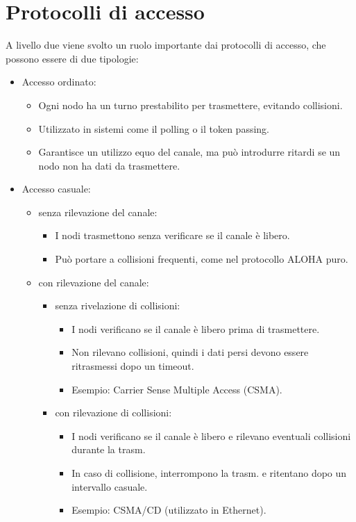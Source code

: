 \section{Protocolli di accesso}
A livello due viene svolto un ruolo importante dai protocolli di accesso, che possono essere di due tipologie:
\begin{itemize}
    \item Accesso ordinato:
    \begin{itemize}
        \item Ogni nodo ha un turno prestabilito per trasmettere, evitando collisioni.
        \item Utilizzato in sistemi come il polling o il token passing.
        \item Garantisce un utilizzo equo del canale, ma può introdurre ritardi se un nodo non ha dati da trasmettere.
    \end{itemize}
    \item Accesso casuale:
    \begin{itemize}
        \item senza rilevazione del canale:
        \begin{itemize}
            \item I nodi trasmettono senza verificare se il canale è libero.
            \item Può portare a collisioni frequenti, come nel protocollo ALOHA puro.
        \end{itemize}
        \item con rilevazione del canale:
        \begin{itemize}
            \item senza rivelazione di collisioni:
            \begin{itemize}
                \item I nodi verificano se il canale è libero prima di trasmettere.
                \item Non rilevano collisioni, quindi i dati persi devono essere ritrasmessi dopo un timeout.
                \item Esempio: Carrier Sense Multiple Access (CSMA).
            \end{itemize}
            \item con rilevazione di collisioni:
            \begin{itemize}
                \item I nodi verificano se il canale è libero e rilevano eventuali collisioni durante la trasm.
                \item In caso di collisione, interrompono la trasm. e ritentano dopo un intervallo casuale.
                \item Esempio: CSMA/CD (utilizzato in Ethernet).
            \end{itemize}
        \end{itemize}
    \end{itemize}
\end{itemize}
\newpage

